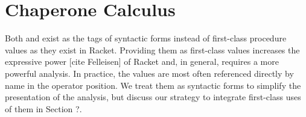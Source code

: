 \documentclass{sigplanconf}
\begin{document}






\section{Chaperone Calculus}


Both  and  exist as the tags of syntactic forms instead of first-class procedure values as they exist in Racket.
Providing them as first-class values increases the expressive power [cite Felleisen] of Racket and, in general, requires a more powerful analysis.
In practice, the values are most often referenced directly by name in the operator position.
We treat them as syntactic forms to simplify the presentation of the analysis, but discuss our strategy to integrate first-class uses of them in Section ?.
\end{document}
